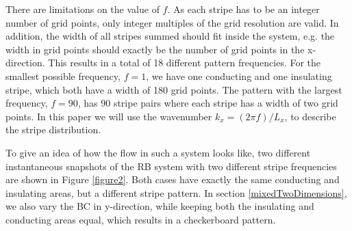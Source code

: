 \documentclass{jfm}
\begin{document}
There are limitations on the value of $f$. As each stripe has to be an integer
number of grid points, only integer multiples of the grid resolution are
valid. In addition, the width of all stripes summed should fit inside the
system, e.g. the width in grid points should exactly be the number of grid
points in the x-direction. This results in a total of 18 different pattern
frequencies. For the smallest possible frequency, $f=1$, we have one
conducting and one insulating stripe, which both have a width of 180 grid
points. The pattern with the largest frequency, $f=90$, has 90 stripe pairs
where each stripe has a width of two grid points. In this paper we will use
the wavenumber $k_x = \left( 2 \pi f \right) / L_x$, to describe the stripe
distribution.

To give an idea of how the flow in such a system looks like, two different
instantaneous snapshots of the RB system with two different stripe frequencies
are shown in Figure \ref{figure2}. Both cases have exactly the same conducting
and insulating areas, but a different stripe pattern. In section
\ref{mixedTwoDimensions}, we also vary the BC in y-direction, while keeping
both the insulating and conducting areas equal, which results in a
checkerboard pattern.
\end{document}
